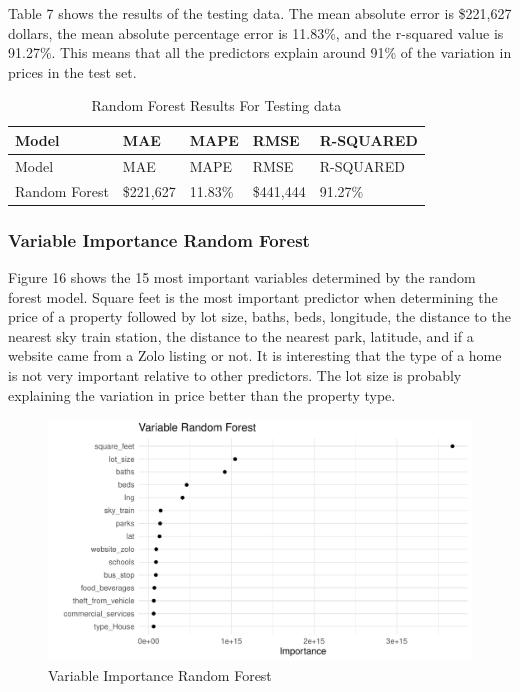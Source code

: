 \documentclass[
]{article}
\begin{document}
Table 7 shows the results of the testing data. The mean absolute error
is \$221,627 dollars, the mean absolute percentage error is 11.83\%, and
the r-squared value is 91.27\%. This means that all the predictors
explain around 91\% of the variation in prices in the test set.

\begin{longtable}[]{@{}lllll@{}}
\caption{Random Forest Results For Testing data}\tabularnewline
\toprule()
Model & MAE & MAPE & RMSE & R-SQUARED \\
\midrule()
\endfirsthead
\toprule()
Model & MAE & MAPE & RMSE & R-SQUARED \\
\midrule()
\endhead
Random Forest & \$221,627 & 11.83\% & \$441,444 & 91.27\% \\
\bottomrule()
\end{longtable}

\newpage

\hypertarget{variable-importance-random-forest}{%
\subsubsection{Variable Importance Random
Forest}\label{variable-importance-random-forest}}

Figure 16 shows the 15 most important variables determined by the random
forest model. Square feet is the most important predictor when
determining the price of a property followed by lot size, baths, beds,
longitude, the distance to the nearest sky train station, the distance
to the nearest park, latitude, and if a website came from a Zolo listing
or not. It is interesting that the type of a home is not very important
relative to other predictors. The lot size is probably explaining the
variation in price better than the property type.

\begin{figure}
\centering
\includegraphics{final_report_files/figure-latex/unnamed-chunk-30-1.pdf}
\caption{Variable Importance Random Forest}
\end{figure}
\end{document}

